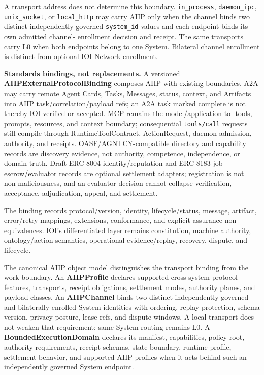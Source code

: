 \documentclass[
  11pt,
]{article}
\begin{document}
A transport address does not determine this boundary. \texttt{in\_process},
\texttt{daemon\_ipc}, \texttt{unix\_socket}, or \texttt{local\_http} may carry
AIIP only when the channel binds two distinct independently governed
\texttt{system\_id} values and each endpoint binds its own admitted channel-
enrollment decision and receipt. The same transports carry L0 when both
endpoints belong to one System. Bilateral channel enrollment is distinct from
optional IOI Network enrollment.

\textbf{Standards bindings, not replacements.} A versioned
\textbf{AIIPExternalProtocolBinding} composes AIIP with existing boundaries.
A2A may carry remote Agent Cards, Tasks, Messages, status, context, and
Artifacts into AIIP task/correlation/payload refs; an A2A task marked complete
is not thereby IOI-verified or accepted. MCP remains the model/application-to-
tools, prompts, resources, and context boundary; consequential
\texttt{tools/call} requests still compile through RuntimeToolContract,
ActionRequest, daemon admission, authority, and receipts. OASF/AGNTCY-compatible
directory and capability records are discovery evidence, not authority,
competence, independence, or domain truth. Draft ERC-8004 identity/reputation
and ERC-8183 job-escrow/evaluator records are optional settlement adapters;
registration is not non-maliciousness, and an evaluator decision cannot
collapse verification, acceptance, adjudication, appeal, and settlement.

The binding records protocol/version, identity, lifecycle/status, message,
artifact, error/retry mappings, extensions, conformance, and explicit assurance
non-equivalences. IOI's differentiated layer remains constitution, machine
authority, ontology/action semantics, operational evidence/replay, recovery,
dispute, and lifecycle.

The canonical AIIP object model distinguishes the transport binding from
the work boundary. An \textbf{AIIPProfile} declares supported cross-system
protocol features, transports, receipt obligations, settlement modes,
authority planes, and payload classes. An \textbf{AIIPChannel} binds two
distinct independently governed and bilaterally enrolled System identities
with ordering, replay protection, schema version, privacy posture, lease refs,
and dispute windows. A local transport does not weaken that requirement;
same-System routing remains L0. A \textbf{BoundedExecutionDomain} declares its
manifest, capabilities, policy root, authority requirements, receipt schemas,
state boundary, runtime profile, settlement behavior, and supported AIIP
profiles when it acts behind such an independently governed System endpoint.
\end{document}
